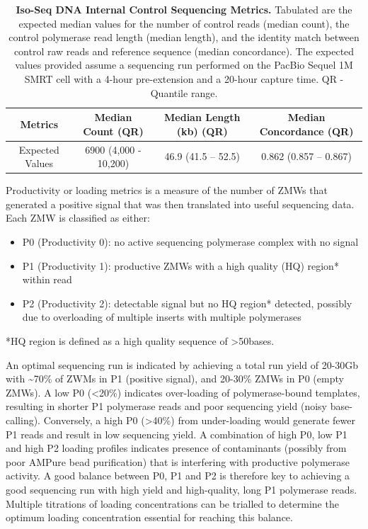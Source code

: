 \vspace{1cm}
\begin{table}[!h]
	\caption[Iso-Seq DNA Internal Control Sequencing Metrics]%
	{\textbf{Iso-Seq DNA Internal Control Sequencing Metrics.} Tabulated are the expected median values for the number of control reads (median count), the control polymerase read length (median length), and the identity match between control raw reads and reference sequence (median concordance). The expected values provided assume a sequencing run performed on the PacBio Sequel 1M SMRT cell with a 4-hour pre-extension and a 20-hour capture time. QR - Quantile range.}	\label{tab:control_Isoseqmetrics}
	
	\centering
	\begin{tabular}{@{}cccc@{}}
		\toprule
		Metrics         & Median Count (QR)     & Median Length (kb) (QR) & Median Concordance (QR) \\ \midrule
		Expected Values & 6900 (4,000 - 10,200) & 46.9 (41.5 – 52.5) & 0.862 (0.857 – 0.867)   \\ \bottomrule
	\end{tabular}
\end{table}


Productivity or loading metrics is a measure of the number of ZMWs that generated a positive signal that was then translated into useful sequencing data. Each ZMW is classified as either: 
\begin{itemize}
	\item P0 (Productivity 0): no active sequencing polymerase complex with no signal 
	\item P1 (Productivity 1): productive ZMWs with a high quality (HQ) region* within read 
	\item P2 (Productivity 2): detectable signal but no HQ region* detected, possibly due to overloading of multiple inserts with multiple polymerases
\end{itemize}
*HQ region is defined as a high quality sequence of >50bases.   

An optimal sequencing run is indicated by achieving a total run yield of 20-30Gb with \textasciitilde70\% of ZWMs in P1 (positive signal), and 20-30\% ZMWs in P0 (empty ZMWs). A low P0 (<20\%) indicates over-loading of polymerase-bound templates, resulting in shorter P1 polymerase reads and poor sequencing yield (noisy base-calling). Conversely, a high P0 (>40\%) from under-loading would generate fewer P1 reads and result in low sequencing yield. A combination of high P0, low P1 and high P2 loading profiles indicates presence of contaminants (possibly from poor AMPure bead purification) that is interfering with productive polymerase activity. A good balance between P0, P1 and P2 is therefore key to achieving a good sequencing run with high yield and high-quality, long P1 polymerase reads. Multiple titrations of loading concentrations can be trialled to determine the optimum loading concentration essential for reaching this balance. 

